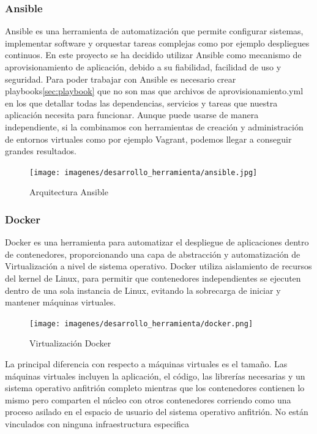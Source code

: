 \documentclass[a4paper,11pt]{book}
\begin{document}
\subsubsection{Ansible}

Ansible\cite{ans} es una herramienta de automatización que permite configurar sistemas, implementar software y orquestar tareas complejas como por ejemplo despliegues continuos. En este proyecto se ha decidido utilizar Ansible como mecanismo de aprovisionamiento de aplicación, debido a su fiabilidad, facilidad de uso y seguridad. Para poder trabajar con Ansible es necesario crear playbooks\ref{sec:playbook} que no son mas que archivos de aprovisionamiento.yml en los que detallar todas las dependencias, servicios y tareas que nuestra aplicación necesita para funcionar. Aunque puede usarse de manera independiente, si la combinamos con herramientas de creación y administración de entornos virtuales como por ejemplo Vagrant, podemos llegar a conseguir grandes resultados.

\begin{figure}[H] 
\centering 
\texttt{[image: imagenes/desarrollo\_herramienta/ansible.jpg]}
\caption{ Arquitectura Ansible\cite{ans2}}
\end{figure}



\subsubsection{Docker}

Docker\cite{dk} es una herramienta para automatizar el despliegue de aplicaciones dentro de contenedores, proporcionando una capa de abstracción y automatización de Virtualización a nivel de sistema operativo. Docker utiliza aislamiento de recursos del kernel de Linux, para permitir que contenedores independientes se ejecuten dentro de una sola instancia de Linux, evitando la sobrecarga de iniciar y mantener máquinas virtuales.

\begin{figure}[H] 
\centering 
\texttt{[image: imagenes/desarrollo\_herramienta/docker.png]}
\caption{ Virtualización Docker\cite{dkw}}
\end{figure}

La principal diferencia con respecto a máquinas virtuales es el tamaño. Las máquinas virtuales incluyen la aplicación, el código, las librerías necesarias y un sistema operativo anfitrión completo mientras que los contenedores contienen lo mismo pero comparten el núcleo con otros contenedores corriendo como una proceso asilado en el espacio de usuario del sistema operativo anfitrión. No están vinculados con ninguna infraestructura especifica 
\end{document}
